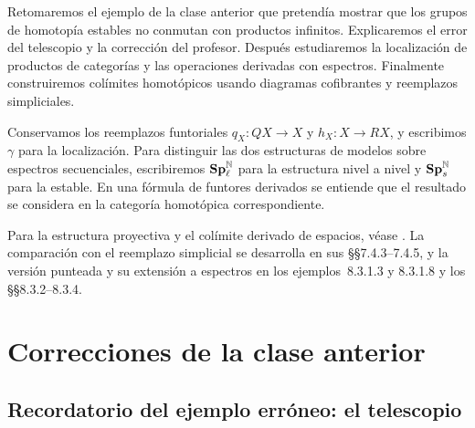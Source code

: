 
Retomaremos el ejemplo de la clase anterior que pretendía mostrar que los grupos de homotopía estables no conmutan con productos infinitos. Explicaremos el error del telescopio y la corrección del profesor. Después estudiaremos la localización de productos de categorías y las operaciones derivadas con espectros. Finalmente construiremos colímites homotópicos usando diagramas cofibrantes y reemplazos simpliciales.

Conservamos los reemplazos funtoriales $q_X\colon QX\to X$ y $h_X\colon X\to RX$, y escribimos $\gamma$ para la localización. Para distinguir las dos estructuras de modelos sobre espectros secuenciales, escribiremos $\mathbf{Sp}^{\mathbb N}_{\ell}$ para la estructura nivel a nivel y $\mathbf{Sp}^{\mathbb N}_s$ para la estable. En una fórmula de funtores derivados se entiende que el resultado se considera en la categoría homotópica correspondiente.

Para la estructura proyectiva y el colímite derivado de espacios, véase \cite[\S\S5.3.2--5.3.3]{malkiewich}. La comparación con el reemplazo simplicial se desarrolla en sus \S\S7.4.3--7.4.5, y la versión punteada y su extensión a espectros en los ejemplos~8.3.1.3 y 8.3.1.8 y los \S\S8.3.2--8.3.4.

\section{Correcciones de la clase anterior}

\subsection{Recordatorio del ejemplo erróneo: el telescopio}

